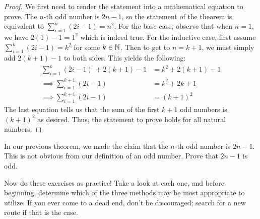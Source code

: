 \begin{proof}
    We first need to render the statement into a mathematical equation to prove. The $n$-th odd number is $2n-1$, so the statement of the theorem is equivalent to $\sum_{i=1}^n (2i-1) = n^2$. For the base case, observe that when $n=1$, we have $2(1)-1 = 1^2$ which is indeed true. For the inductive case, first assume $\sum_{i=1}^k (2i-1) = k^2$ for some $k\in\mathbb{N}$. Then to get to $n=k+1$, we must simply add $2(k+1)-1$ to both sides. This yields the following:
    \begin{align*}
        \sum_{i=1}^{k} (2i-1)\ + 2(k+1)-1 &= k^2 + 2(k+1)-1 \\
        \implies \sum_{i=1}^{k+1} (2i-1) &= k^2 + 2k + 1 \\
        \implies \sum_{i=1}^{k+1} (2i-1) &= (k+1)^2
    \end{align*}
    The last equation tells us that the sum of the first $k+1$ odd numbers is $(k+1)^2$ as desired. Thus, the statement to prove holds for all natural numbers. 
\end{proof}

\begin{exercise}
    In our previous theorem, we made the claim that the $n$-th odd number is $2n-1$. This is not obvious from our definition of an odd number. Prove that $2n-1$ is odd.
\end{exercise}

Now do these exercises as practice! Take a look at each one, and before beginning, determine which of the three methods may be most appropriate to utilize. If you ever come to a dead end, don't be discouraged; search for a new route if that is the case.

